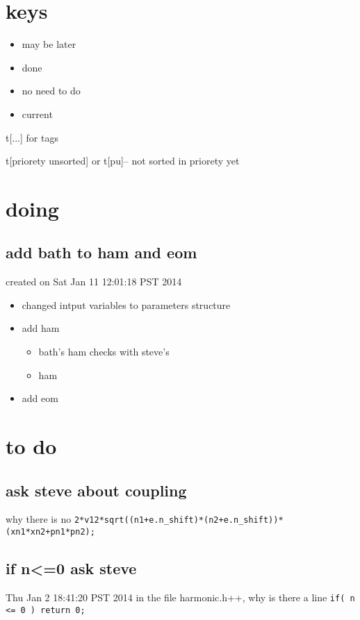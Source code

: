 \documentclass{article}
\let\Item\item
\renewcommand\item{\normalcolor\Item}
\newcommand\ml{\color[RGB]{153, 150, 204}} %
\newcommand\nn{\color[RGB]{124, 124, 255}} %
\newcommand\done{\color[RGB]{129, 180, 185} \ding{52} }
\newcommand\now{\color[RGB]{255, 0, 0}} %
\begin{document}
\section{keys}
\begin{itemize}
  \item \ml may be later
  \item \done done
  \item \nn no need to do
  \item \now current 
\end{itemize}

t[...] for tags

t[priorety unsorted] or t[pu]-- not sorted in priorety yet

\section{doing}
\subsection{add bath to ham and eom}
created on Sat Jan 11 12:01:18 PST 2014
\label{sub:add_bath_to_ham_and_eom}
\begin{itemize}
  \item \done changed intput variables to parameters structure
  \item add ham
    \begin{itemize}
      \item \done bath's ham checks with steve's
      \item \done ham
    \end{itemize}
  \item \done add eom
\end{itemize}
\section{to do}
\subsection{ask steve about coupling}
\label{sub:ask_steve_about_coupling}
why there is no \verb`2*v12*sqrt((n1+e.n_shift)*(n2+e.n_shift))*(xn1*xn2+pn1*pn2);`
\subsection{if n<=0 ask steve}
Thu Jan  2 18:41:20 PST 2014
\label{sub:if_n_0_ask_steve}
in the file harmonic.h++, why is there a line \verb`if( n <= 0 ) return 0;`
\end{document}
